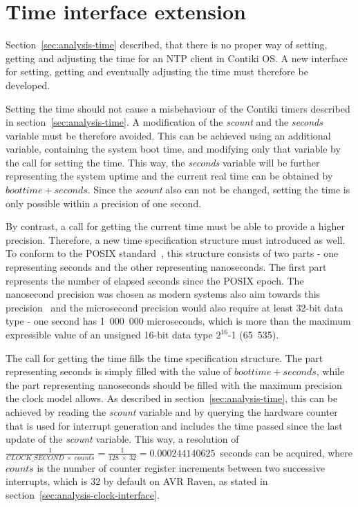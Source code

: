 
\section{Time interface extension}\label{sec:analysis-interface}
Section~\ref{sec:analysis-time} described, that there is no proper
way of setting, getting and adjusting the time for an NTP client in Contiki OS.
A new interface for setting, getting and eventually adjusting the time
must therefore be developed.

Setting the time should not cause a misbehaviour of the Contiki timers
described in section~\ref{sec:analysis-time}.
A modification of the {\it{scount}} and the {\it{seconds}} variable must be therefore avoided.
This can be achieved using an additional variable, containing the system boot time,
and modifying only that variable by the call for setting the time.
This way, the {\it{seconds}} variable will be further representing the system uptime
and the current real time can be obtained by $boottime + seconds$.
Since the {\it{scount}} also can not be changed, setting the time is only possible
within a precision of one second.

By contrast, a call for getting the current time must be able to provide a higher precision.
Therefore, a new time specification structure must introduced as well.
To conform to the POSIX standard~\cite{posix}, this structure consists of two parts -
one representing seconds and the other representing nanoseconds.
The first part represents the number of elapsed seconds since the POSIX epoch.
The nanosecond precision was chosen as modern systems also aim towards this
precision~\cite{posix,ntp-precision} and
the microsecond precision would also require at least 32-bit data type -
one second has 1~000~000 microseconds, which is more than the maximum expressible value of
an unsigned 16-bit data type $2^{16}$-1 (65~535).

The call for getting the time fills the time specification structure.
The part representing seconds is simply filled with the value of $boottime + seconds$,
while the part representing nanoseconds should be filled with the maximum precision
the clock model allows.
As described in section~\ref{sec:analysis-time},
this can be achieved by reading the {\it{scount}} variable
and by querying the hardware counter that is used for
interrupt generation and includes the time passed since
the last update of the {\it{scount}} variable.
This way, a resolution of
$\frac{1}{CLOCK\_SECOND~\times~counts} = \frac{1}{128~\times~32} = 0.000244140625$~seconds
can be acquired,
where $counts$ is the number of counter register increments between two successive interrupts,
which is 32 by default on AVR Raven, as stated in section~\ref{sec:analysis-clock-interface}.

